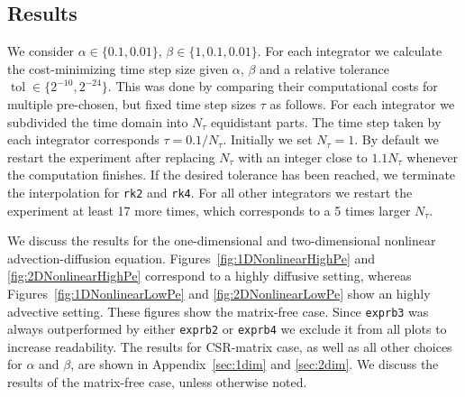 \documentclass{scrartcl}
\begin{document}
\subsection{Results} \label{sec:Results}
	We consider $\alpha\in\{0.1,0.01\}$, $\beta\in\{1, 0.1, 0.01\}$. For each integrator we calculate the cost-minimizing time step size given $\alpha$, $\beta$ and a relative tolerance $\operatorname{tol}\in \{2^{-10},2^{-24}\}$. This was done by comparing their computational costs for multiple pre-chosen, but fixed time step sizes $\tau$ as follows. For each integrator we subdivided the time domain into $N_\tau$ equidistant parts. The time step taken by each integrator corresponds $\tau = 0.1/N_\tau$. Initially we set $N_\tau=1$. By default we restart the experiment after replacing $N_\tau$ with an integer close to $1.1N_\tau$ whenever the computation finishes. If the desired tolerance has been reached, we terminate the interpolation for \texttt{rk2} and \texttt{rk4}. For all other integrators we restart the experiment at least 17 more times, which corresponds to a 5 times larger $N_\tau$. 
	
	We discuss the results for the one-dimensional and two-dimensional nonlinear advection-diffusion equation. Figures~\ref{fig:1DNonlinearHighPe} and \ref{fig:2DNonlinearHighPe} correspond to a highly diffusive setting, whereas Figures~\ref{fig:1DNonlinearLowPe} and \ref{fig:2DNonlinearLowPe} show an highly advective setting.
	These figures show the matrix-free case. Since \texttt{exprb3} was always outperformed by either \texttt{exprb2} or \texttt{exprb4} we exclude it from all plots to increase readability. The results for CSR-matrix case, as well as all other choices for $\alpha$ and $\beta$, are shown in Appendix~\ref{sec:1dim} and \ref{sec:2dim}. We discuss the results of the matrix-free case, unless otherwise noted.
	
\end{document}
